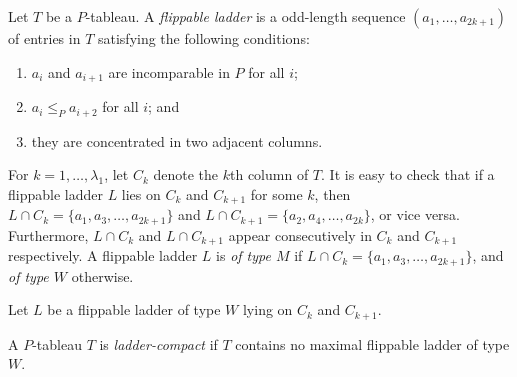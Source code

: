 \documentclass[12pt,a4paper,reqno]{amsart}
\theoremstyle{definition}
\theoremstyle{remark}
\begin{document}
Let \( T \) be a \( P \)-tableau. A \emph{flippable ladder} is a odd-length sequence
\( (a_1,\dots,a_{2k+1}) \) of entries in \( T \) satisfying the following conditions:
\begin{enumerate}[label=(\roman*)]
  \item \( a_i \) and \( a_{i+1} \) are incomparable in \( P \) for all \( i \);
  \item \( a_i \le_P a_{i+2} \) for all \( i \); and
  \item they are concentrated in two adjacent columns.
\end{enumerate}
For \( k=1,\dots,\lambda_1 \), let \( C_k \) denote the \( k \)th column of \( T \).
It is easy to check that if a flippable ladder \( L \) lies on \( C_k \) and \( C_{k+1} \) for some
\( k \), then \( L\cap C_k = \{a_1,a_3,\dots,a_{2k+1}\} \) and \( L\cap C_{k+1} =
\{a_2,a_4,\dots,a_{2k}\} \), or vice versa. Furthermore, \( L\cap C_k \) and \( L\cap C_{k+1} \)
appear consecutively in \( C_k \) and \( C_{k+1} \) respectively.
A flippable ladder \( L \) is \emph{of type \( M \)} if \( L \cap C_k = \{a_1,a_3,\dots,a_{2k+1}\} \),
and \emph{of type \( W \)} otherwise.

Let \( L \) be a flippable ladder of type \( W \) lying on \( C_k \) and \( C_{k+1} \).



A \( P \)-tableau \( T \) is \emph{ladder-compact} if \( T \) contains no maximal flippable ladder
of type \( W \).
\end{document}
